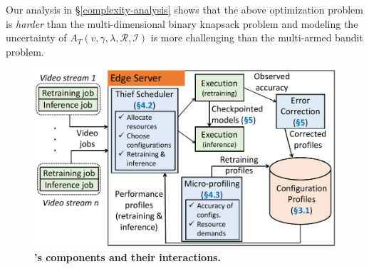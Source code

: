 
Our analysis in \S\ref{complexity-analysis} shows that the above optimization problem is {\em harder} than the multi-dimensional binary knapsack problem and modeling the uncertainty of $A_T(v, \gamma, \lambda, \mathcal{R}, \mathcal{I})$ is more challenging than the multi-armed bandit problem.


\begin{figure}[t]
    \centering
    \includegraphics[width=.85\columnwidth]{ekya/figures/overview_cropped.pdf}
    \caption{\small\bf {\name}'s components and their interactions. }%
    \label{fig:sys-arch}
\end{figure}

